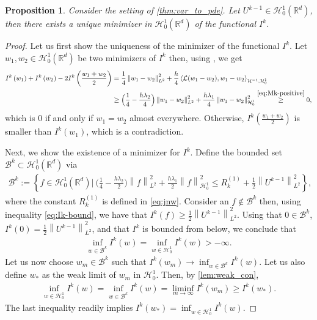 \documentclass[11pt,a4paper,reqno]{amsart}
\numberwithin{equation}{section}
\theoremstyle{plain}
\newtheorem{proposition}[theorem]{Proposition}
\theoremstyle{definition}
\newcommand{\ip}[1]{\left\langle#1\right\rangle}
\newcommand{\cL}{\mathcal{L}}
\newcommand{\cH}{\mathcal{H}}
\newcommand{\R}{\mathbb{R}}
\newcommand{\norm}[1]{\left\|#1 \right\|} %
\begin{document}
\begin{proposition}
\label{prop:main1}
Consider the setting of \cref{thm:var_to_pde}. 
Let $U^{k - 1} \in \mathcal{H}_0^1 (\R^d)$, then there exists a unique minimizer in $\mathcal{H}_0^1 (\R^d)$ of the functional $I^k$. 
\end{proposition}

\begin{proof}
Let us first show the uniqueness of the minimizer of the functional $I^k$. 
Let $w_1,w_2\in\mathcal{H}_0^1 (\R^d)$ be two minimizers of $I^k$ then, using , we get
\begin{align*}
I^k \left( w_1 \right) + I^k \left( w_2 \right) - 2 I^k \left( \frac{w_1 + w_2}{2} \right) 
    &= \frac{1}{4}\norm{w_1 - w_2}^2_{L^2} + \frac{h}{4} \ip{\cL  (w_1-w_2),  w_1-w_2}_{\cH^{-1},\cH_0^1} \\
    &\ge \Big(\frac{1}{4}-\frac{h \lambda_2}{4}\Big) \norm{w_1-w_2}^2_{L^2} + \frac{h\lambda_1}{4} \norm{w_1-w_2}^2_{\cH_0^1}
    \overset{\eqref{eq:Mk-positive}}{\ge} 0, 
\end{align*}
which is $0$ if and only if $w_1 = w_2$ almost everywhere. Otherwise, $I^k \left( \frac{w_1 + w_2}{2} \right)$ is smaller than $I^k \left( w_1 \right)$, which is a contradiction.

Next, we show the existence of a minimizer for $I^k$.
Define the bounded set $\mathcal{B}^k \subset \mathcal{H}_0^1 (\R^d)$ via
\begin{align*}
\mathcal{B}^k 
    := \left\{ f \in \mathcal{H}_0^1 (\R^d) \Big| \ \Big(\frac{1}{4}-\frac{h \lambda_2}{2}\Big) \norm{f}^2_{L^2} + \frac{h \lambda_1}{2} \norm{f}^2_{\cH_0^1}  \leq R^{\left( 1 \right)}_k +\frac{1}{2}\norm{U^{k-1}}^2_{L^2}\right\} , 
\end{align*}
where the constant $R^{\left( 1 \right)}_k$ is defined in \eqref{eq:jnw}. 
Consider an $f \notin \mathcal{B}^k$ then, using inequality \eqref{eq:Ik-bound}, we have that $I^k \left( f \right) \ge \frac{1}{2}\norm{U^{k-1}}^2_{L^2}$. 
Using that $0\in \mathcal{B}^k$, $I^k( 0 ) = \frac{1}{2}\norm{U^{k-1}}^2_{L^2}$, and that $I^k$ is bounded from below, we conclude that
\begin{align*}
    \inf_{w \in \mathcal{B}^k} I^k \left( w \right) = \inf_{w \in \mathcal{H}_0^1} I^k \left( w \right) > - \infty.
\end{align*}
Let us now choose $w_m \in \mathcal{B}^k $ such that $I^k \left( w_m \right) \to \inf_{w \in \mathcal{B}^k} I^k \left( w \right)$. 
Let us also define $w_*$ as the weak limit of $w_m$ in $\cH_0^1$. 
Then, by \cref{lem:weak_con}, 
\begin{align*}
 \inf_{w \in \mathcal{H}_0^1} I^k \left( w \right) = \inf_{w \in \mathcal{B}^k} I^k \left( w \right) = \liminf_{m \to \infty} I^k \left( w_m \right) \ge I^k \left( w_* \right) .
\end{align*}
The last inequality readily implies $I^k \left( w_* \right) = \inf_{w \in \mathcal{H}_0^1} I^k \left( w \right)$.
\end{proof}
\end{document}
